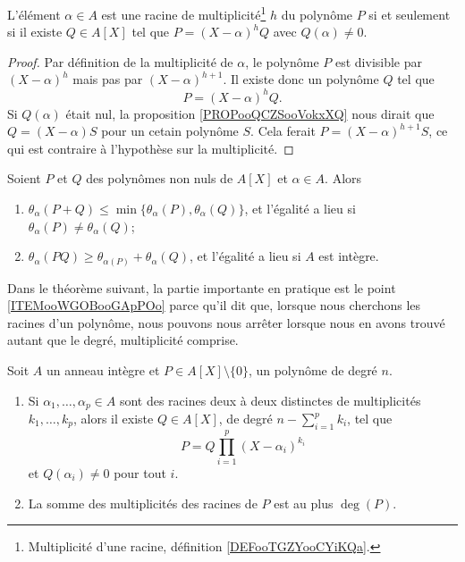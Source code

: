 \begin{proposition} \label{PropahQQpA}
	L'élément \( \alpha\in A\) est une racine de multiplicité\footnote{Multiplicité d'une racine, définition \ref{DEFooTGZYooCYiKQa}.} \( h\) du polynôme \( P\) si et seulement si il existe \( Q\in A[X]\) tel que \( P=(X-\alpha)^hQ\) avec \( Q(\alpha)\neq 0\).
\end{proposition}

\begin{proof}
	Par définition de la multiplicité de \( \alpha\), le polynôme \( P\) est divisible par \( (X-\alpha)^h\) mais pas par \( (X-\alpha)^{h+1}\). Il existe donc un polynôme \( Q\) tel que
	\begin{equation}
		P=(X-\alpha)^hQ.
	\end{equation}
	Si \( Q(\alpha)\) était nul, la proposition \ref{PROPooQCZSooVokxXQ} nous dirait que \( Q =(X-\alpha)S \) pour un cetain polynôme \( S\). Cela ferait \( P=(X-\alpha)^{h+1}S\), ce qui est contraire à l'hypothèse sur la multiplicité.
\end{proof}

\begin{lemma}       \label{LemIeLhpc}
	Soient \( P\) et \( Q\) des polynômes non nuls de \( A[X]\) et \( \alpha\in A\). Alors
	\begin{enumerate}
		\item
		      \( \theta_{\alpha}(P+Q)\leq\min\{
		      \theta_{\alpha}(P),\theta_{\alpha}(Q) \}\), et l'égalité a
		      lieu si \( \theta_{\alpha}(P)\neq \theta_{\alpha}(Q)\);
		\item     \label{ItemIeLhpciv}
		      \( \theta_{\alpha}(PQ)\geq
		      \theta_{\alpha(P)}+\theta_{\alpha}(Q)\), et l'égalité a
		      lieu si \( A \) est intègre.
	\end{enumerate}
\end{lemma}

Dans le théorème suivant, la partie importante en pratique est le point \ref{ITEMooWGOBooGApPOo} parce qu'il dit que, lorsque nous cherchons les racines d'un polynôme, nous pouvons nous arrêter lorsque nous en avons trouvé autant que le degré, multiplicité comprise.
\begin{theorem} \label{ThoSVZooMpNANi}
	Soit \( A\) un anneau intègre
	et \( P\in A[X]\setminus\{ 0 \}\), un polynôme de degré \( n\).

	\begin{enumerate}
		\item
		      Si \( \alpha_1,\ldots, \alpha_p\in A\) sont des racines deux à deux
		      distinctes de multiplicités \( k_1,\ldots, k_p\), alors il existe \(
		      Q\in A[X]\), de degré \( n-\sum_{i=1}^pk_i\), tel que
		      \begin{equation}
			      P=Q\prod_{i=1}^p(X-\alpha_i)^{k_i}
		      \end{equation}
		      et \( Q(\alpha_i)\neq 0\) pour tout \( i\).
		\item     \label{ITEMooWGOBooGApPOo}
		      La somme des multiplicités des racines de \( P\) est au plus \( \deg(P)\).
	\end{enumerate}
\end{theorem}


